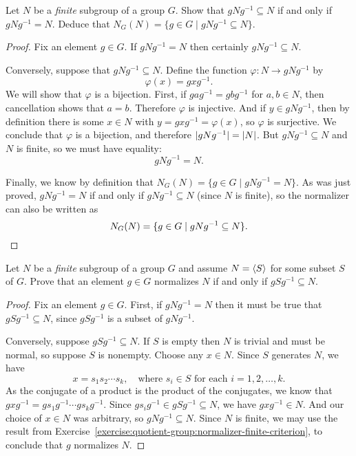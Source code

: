 \label{exercise:quotient-group:normalizer-finite-criterion}
Let $N$ be a {\em finite} subgroup of a group $G$. Show
that $gNg^{-1}\subseteq N$ if and only if $gNg^{-1} = N$. Deduce that
$N_G(N) = \{g\in G\mid gNg^{-1}\subseteq N\}$.
\begin{proof}
  Fix an element $g\in G$. If $gNg^{-1} = N$ then certainly
  $gNg^{-1}\subseteq N$.

  Conversely, suppose that $gNg^{-1}\subseteq N$. Define the function
  $\varphi\colon N\to gNg^{-1}$ by
  \begin{equation*}
    \varphi(x) = gxg^{-1}.
  \end{equation*}
  We will show that $\varphi$ is a bijection. First, if
  $gag^{-1} = gbg^{-1}$ for $a,b\in N$, then cancellation shows that
  $a = b$. Therefore $\varphi$ is injective. And if $y\in gNg^{-1}$,
  then by definition there is some $x\in N$ with
  $y = gxg^{-1} = \varphi(x)$, so $\varphi$ is surjective. We conclude
  that $\varphi$ is a bijection, and therefore
  $\lvert{gNg^{-1}}\rvert = \lvert{N}\rvert$. But $gNg^{-1}\subseteq N$ and $N$ is
  finite, so we must have equality:
  \begin{equation*}
    gNg^{-1} = N.
  \end{equation*}

  Finally, we know by definition that
  $N_G(N) = \{g\in G\mid gNg^{-1} = N\}$. As was just proved,
  $gNg^{-1} = N$ if and only if $gNg^{-1}\subseteq N$ (since $N$ is
  finite), so the normalizer can also be written as
  \begin{equation*}
    N_G(N) = \{g\in G\mid gNg^{-1}\subseteq N\}. \qedhere
  \end{equation*}
\end{proof}

\label{exercise:quotient-group:normalizer-iff-generator1}
Let $N$ be a {\em finite} subgroup of a group $G$ and
assume $N = \langle{S}\rangle$ for some subset $S$ of $G$. Prove that an element
$g\in G$ normalizes $N$ if and only if $gSg^{-1}\subseteq N$.
\begin{proof}
  Fix an element $g\in G$. First, if $gNg^{-1} = N$ then it must be
  true that $gSg^{-1}\subseteq N$, since $gSg^{-1}$ is a subset of
  $gNg^{-1}$.

  Conversely, suppose $gSg^{-1}\subseteq N$. If $S$ is empty then $N$
  is trivial and must be normal, so suppose $S$ is nonempty. Choose
  any $x\in N$. Since $S$ generates $N$, we have
  \begin{equation*}
    x = s_1s_2\cdots s_k,
    \quad\text{where $s_i\in S$ for each $i=1,2,\dots,k$}.
  \end{equation*}
  As the conjugate of a product is the product of the conjugates, we
  know that $gxg^{-1} = gs_1g^{-1}\cdots gs_kg^{-1}$. Since
  $gs_ig^{-1}\in gSg^{-1}\subseteq N$, we have $gxg^{-1}\in N$. And
  our choice of $x\in N$ was arbitrary, so $gNg^{-1}\subseteq
  N$. Since $N$ is finite, we may use the result from
  Exercise~\ref{exercise:quotient-group:normalizer-finite-criterion},
  to conclude that $g$ normalizes $N$.
\end{proof}

